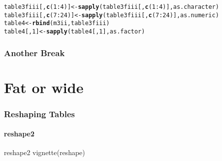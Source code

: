 \documentclass{article}\usepackage[]{graphicx}\usepackage[]{color}
\makeatletter
\newcommand{\hlnum}[1]{\textcolor[rgb]{0.686,0.059,0.569}{#1}}%
\newcommand{\hlopt}[1]{\textcolor[rgb]{0,0,0}{#1}}%
\newcommand{\hlstd}[1]{\textcolor[rgb]{0.345,0.345,0.345}{#1}}%
\newcommand{\hlkwb}[1]{\textcolor[rgb]{0.69,0.353,0.396}{#1}}%
\newcommand{\hlkwd}[1]{\textcolor[rgb]{0.737,0.353,0.396}{\textbf{#1}}}%
\newenvironment{kframe}{%
 \def\at@end@of@kframe{}%
 \ifinner\ifhmode%
  \def\at@end@of@kframe{\end{minipage}}%
  \begin{minipage}{\columnwidth}%
 \fi\fi%
 \def\FrameCommand##1{\hskip\@totalleftmargin \hskip-\fboxsep
 \colorbox{shadecolor}{##1}\hskip-\fboxsep
     \hskip-\linewidth \hskip-\@totalleftmargin \hskip\columnwidth}%
 \MakeFramed {\advance\hsize-\width
   \@totalleftmargin\z@ \linewidth\hsize
   \@setminipage}}%
 {\par\unskip\endMakeFramed%
 \at@end@of@kframe}
\newenvironment{knitrout}{}{} %
\makeatother
\begin{document}
\begin{frame}[fragile]
\begin{knitrout}
\begin{kframe}
\begin{alltt}
\hlstd{table3fiii[,}\hlkwd{c}\hlstd{(}\hlnum{1}\hlopt{:}\hlnum{4}\hlstd{)]} \hlkwb{<-} \hlkwd{sapply}\hlstd{(table3fiii[,}\hlkwd{c}\hlstd{(}\hlnum{1}\hlopt{:}\hlnum{4}\hlstd{)],as.character)}
\hlstd{table3fiii[,}\hlkwd{c}\hlstd{(}\hlnum{7}\hlopt{:}\hlnum{24}\hlstd{)]} \hlkwb{<-} \hlkwd{sapply}\hlstd{(table3fiii[,}\hlkwd{c}\hlstd{(}\hlnum{7}\hlopt{:}\hlnum{24}\hlstd{)],as.numeric)}
\hlstd{table4}\hlkwb{<-}\hlkwd{rbind}\hlstd{(m3ii,table3fiii)}
\hlstd{table4[,}\hlnum{1}\hlstd{]} \hlkwb{<-} \hlkwd{sapply}\hlstd{(table4[,}\hlnum{1}\hlstd{],as.factor)}
\end{alltt}
\end{kframe}
\end{knitrout}
\end{frame}

\begin{frame}
  \frametitle{Another Break}
\end{frame}


\section*{Fat or wide}
\begin{frame}[fragile]
  \frametitle{Reshaping Tables}
  \framesubtitle{reshape2}
  \begin{block}{reshape2}
  vignette(reshape)
  \end{block}
\end{frame}  
\end{document}
